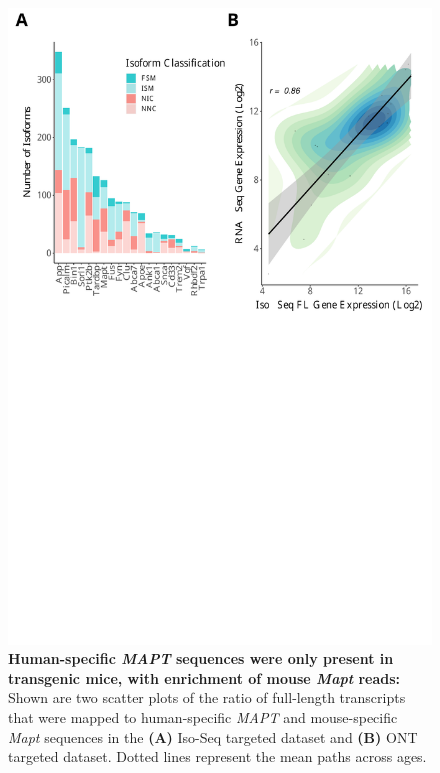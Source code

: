 \begin{figure}[!htp]
	\begin{center}
		\includegraphics[page=12,trim={0 20cm 0 0cm},clip,scale = 0.60]{Figures/ONTvsIsoSeq.pdf}
	\end{center}
	\captionsetup{width=0.95\textwidth}
	\caption[Quantifying human-specific and mouse-specific \textit{MAPT}/\textit{Mapt} sequences in targeted transcriptome profiling approach]%
	{\textbf{Human-specific \textit{MAPT} sequences were only present in transgenic mice, with enrichment of mouse \textit{Mapt} reads:} Shown are two scatter plots of the ratio of full-length transcripts that were mapped to human-specific \textit{MAPT} and mouse-specific \textit{Mapt} sequences in the \textbf{(A)} Iso-Seq targeted dataset and \textbf{(B)} ONT targeted dataset. Dotted lines represent the mean paths across ages.}
	\label{fig:hmapt_ont_isoseq}
\end{figure}

